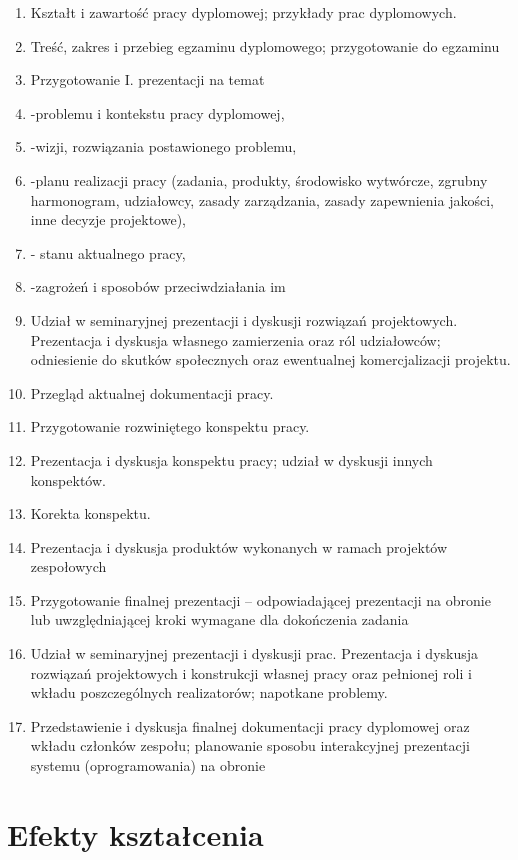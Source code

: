 \documentclass[12pt, a4paper]{article}
\begin{document}
\begin{enumerate}
  \item Kształt i zawartość pracy dyplomowej; przykłady prac dyplomowych.
  \item Treść, zakres i przebieg egzaminu dyplomowego; przygotowanie do egzaminu
  \item Przygotowanie I. prezentacji na temat
  \item -problemu i kontekstu pracy dyplomowej,
  \item -wizji, rozwiązania postawionego problemu,
  \item -planu realizacji pracy (zadania, produkty, środowisko wytwórcze, zgrubny harmonogram, udziałowcy, zasady zarządzania, zasady zapewnienia jakości, inne decyzje projektowe),
  \item - stanu aktualnego pracy,
  \item -zagrożeń i sposobów przeciwdziałania im
  \item Udział w seminaryjnej prezentacji i dyskusji rozwiązań projektowych. Prezentacja i dyskusja własnego zamierzenia oraz ról udziałowców; odniesienie do skutków społecznych oraz ewentualnej komercjalizacji projektu.
  \item Przegląd aktualnej dokumentacji pracy.
  \item Przygotowanie rozwiniętego konspektu pracy.
  \item Prezentacja i dyskusja konspektu pracy; udział w dyskusji innych konspektów.
  \item Korekta konspektu.
  \item Prezentacja i dyskusja produktów wykonanych w ramach projektów zespołowych
  \item Przygotowanie finalnej prezentacji – odpowiadającej prezentacji na obronie lub uwzględniającej kroki wymagane dla dokończenia zadania
  \item Udział w seminaryjnej prezentacji i dyskusji prac. Prezentacja i dyskusja rozwiązań projektowych i konstrukcji własnej pracy oraz pełnionej roli i wkładu poszczególnych realizatorów; napotkane problemy.
  \item Przedstawienie i dyskusja finalnej dokumentacji pracy dyplomowej oraz wkładu członków zespołu; planowanie sposobu interakcyjnej prezentacji systemu (oprogramowania) na obronie
\end{enumerate}

\section{Efekty kształcenia}
\end{document}

